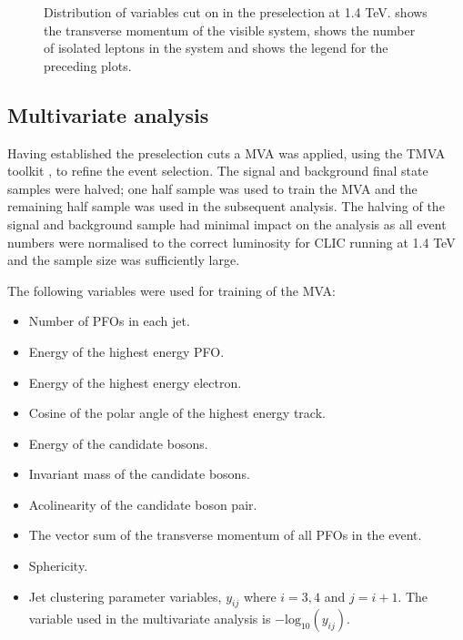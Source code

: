 \begin{figure}[h!]
\caption[Distribution of variables cut on in the preselection at 1.4 TeV.  \protect{} shows the transverse momentum of the visible system, \protect{} shows the number of isolated leptons in the system and \protect{} shows the legend for the preceding plots.]{Distribution of variables cut on in the preselection at 1.4 TeV.  \protect{} shows the transverse momentum of the visible system, \protect{} shows the number of isolated leptons in the system and \protect{} shows the legend for the preceding plots.}
\label{fig:preselection1400}
\end{figure}


\subsection{Multivariate analysis}
\label{sec:mva1400GeV}
Having established the preselection cuts a MVA was applied, using the TMVA toolkit \cite{Hocker:2007ht}, to refine the event selection.  The signal and background final state samples were halved; one half sample was used to train the MVA and the remaining half sample was used in the subsequent analysis.  The halving of the signal and background sample had minimal impact on the analysis as all event numbers were normalised to the correct luminosity for CLIC running at 1.4 TeV and the sample size was sufficiently large.

The following variables were used for training of the MVA:
\begin{itemize}
\item Number of PFOs in each jet. 
\item Energy of the highest energy PFO.
\item Energy of the highest energy electron.
\item Cosine of the polar angle of the highest energy track.
\item Energy of the candidate bosons.
\item Invariant mass of the candidate bosons.
\item Acolinearity of the candidate boson pair.
\item The vector sum of the transverse momentum of all PFOs in the event. 
\item Sphericity. 
\item Jet clustering parameter variables, $y_{ij}$ where $i = 3,4$ and $j=i+1$.  The variable used in the multivariate analysis is $-\text{log}_{10}(y_{ij})$.
\end{itemize}

